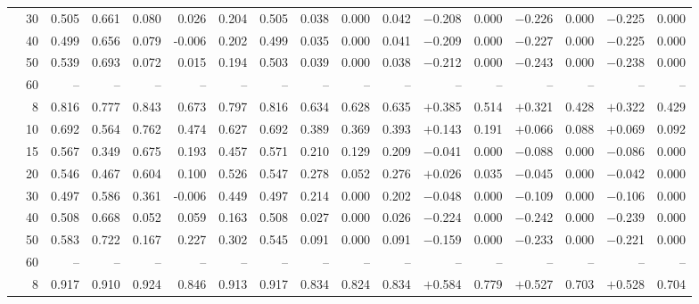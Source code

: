 \documentclass[conference]{IEEEtran}
\theoremstyle{remark}
\begin{document}
\begin{table}[ht]
{\begin{tabular}{p{1.55cm}r rrrr rr rr r rr rr rr}
  & 30 & 0.505 & 0.661 & 0.080 & 0.026 & 0.204 & 0.505 & 0.038 & 0.000 & 0.042 & $-$0.208 & 0.000 & $-$0.226 & 0.000 & $-$0.225 & 0.000 \\
  & 40 & 0.499 & 0.656 & 0.079 & -0.006 & 0.202 & 0.499 & 0.035 & 0.000 & 0.041 & $-$0.209 & 0.000 & $-$0.227 & 0.000 & $-$0.225 & 0.000 \\
  & 50 & 0.539 & 0.693 & 0.072 & 0.015 & 0.194 & 0.503 & 0.039 & 0.000 & 0.038 & $-$0.212 & 0.000 & $-$0.243 & 0.000 & $-$0.238 & 0.000 \\
  & 60 & -- & -- & -- & -- & -- & -- & -- & -- & -- & -- & -- & -- & -- & -- & -- \\
\midrule
{}
  & 8 & 0.816 & 0.777 & 0.843 & 0.673 & 0.797 & 0.816 & 0.634 & 0.628 & 0.635 & $+$0.385 & 0.514 & $+$0.321 & 0.428 & $+$0.322 & 0.429 \\
  & 10 & 0.692 & 0.564 & 0.762 & 0.474 & 0.627 & 0.692 & 0.389 & 0.369 & 0.393 & $+$0.143 & 0.191 & $+$0.066 & 0.088 & $+$0.069 & 0.092 \\
  & 15 & 0.567 & 0.349 & 0.675 & 0.193 & 0.457 & 0.571 & 0.210 & 0.129 & 0.209 & $-$0.041 & 0.000 & $-$0.088 & 0.000 & $-$0.086 & 0.000 \\
  & 20 & 0.546 & 0.467 & 0.604 & 0.100 & 0.526 & 0.547 & 0.278 & 0.052 & 0.276 & $+$0.026 & 0.035 & $-$0.045 & 0.000 & $-$0.042 & 0.000 \\
  & 30 & 0.497 & 0.586 & 0.361 & -0.006 & 0.449 & 0.497 & 0.214 & 0.000 & 0.202 & $-$0.048 & 0.000 & $-$0.109 & 0.000 & $-$0.106 & 0.000 \\
  & 40 & 0.508 & 0.668 & 0.052 & 0.059 & 0.163 & 0.508 & 0.027 & 0.000 & 0.026 & $-$0.224 & 0.000 & $-$0.242 & 0.000 & $-$0.239 & 0.000 \\
  & 50 & 0.583 & 0.722 & 0.167 & 0.227 & 0.302 & 0.545 & 0.091 & 0.000 & 0.091 & $-$0.159 & 0.000 & $-$0.233 & 0.000 & $-$0.221 & 0.000 \\
  & 60 & -- & -- & -- & -- & -- & -- & -- & -- & -- & -- & -- & -- & -- & -- & -- \\
\midrule
{}
  & 8 & 0.917 & 0.910 & 0.924 & 0.846 & 0.913 & 0.917 & 0.834 & 0.824 & 0.834 & $+$0.584 & 0.779 & $+$0.527 & 0.703 & $+$0.528 & 0.704 \\

\end{tabular}}
\end{table}
\end{document}
